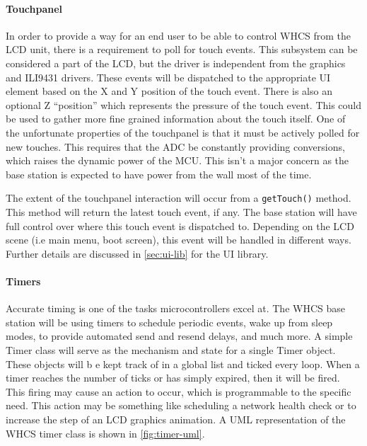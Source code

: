 \paragraph{Touchpanel}
In order to provide a way for an end user to be able to control WHCS from the
LCD unit, there is a requirement to poll for touch events.
This subsystem can be considered a part of the LCD, but the driver is independent
from the graphics and ILI9431 drivers. These events will be dispatched
to the appropriate UI element  based on the X and Y position of the touch
event. There is also an optional Z ``position'' which represents the pressure
of the touch event. This could be used to gather more fine grained information
about the touch itself. One of the unfortunate properties of the touchpanel is
that it must be actively polled for new touches. This requires that the ADC be
constantly providing conversions, which raises the dynamic power of the MCU.
This isn't a major concern as the base station is expected to have power from the wall
most of the time.

The extent of the touchpanel interaction will occur from a \texttt{getTouch()}
method. This method will return the latest touch event, if any. The base
station will have full control over where this touch event is dispatched to.
Depending on the LCD scene (i.e main menu, boot screen), this event will be
handled in different ways. Further details are discussed in
\autoref{sec:ui-lib} for the UI library.

\paragraph{Timers}
Accurate timing is one of the tasks microcontrollers excel at. The WHCS base
station will be using timers to schedule periodic events, wake up from sleep
modes, to provide automated send and resend delays, and much more. A simple
Timer class will serve as the mechanism and state for a single Timer object.
These objects will b e kept track of in a global list and ticked every loop.
When a timer reaches the number of ticks or has simply expired, then it will be
fired. This firing may cause an action to occur, which is programmable to the
specific need. This action may be something like scheduling a network health
check or to increase the step of an LCD graphics animation. A UML representation of the WHCS timer class is shown in \autoref{fig:timer-uml}.


